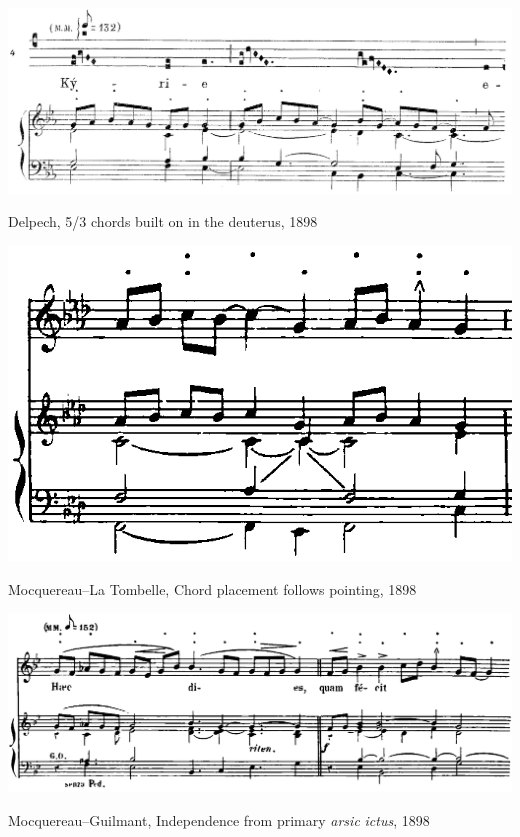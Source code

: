 \begin{example}
  \centering
  \includegraphics[width=\linewidth]{c/3/ex/delpech_deuterus_23.png}
  \caption{Delpech, 5/3 chords built on  in the deuterus, 1898}
  \label{mus:delpech_deuterus_23}
\end{example}

\vspace*{\fill}

\newpage

\vspace*{\fill}

\begin{example}
  \centering
  \includegraphics[width=.6\linewidth]{c/3/ex/latombelle_pascha.png}
  \caption{Mocquereau--La Tombelle, Chord placement follows pointing, 1898}
  \label{mus:latombelle_pascha}
\end{example}

\vspace*{\fill}

\begin{example}
  \centering
  \includegraphics[width=.9\linewidth]{c/3/ex/guilmant_haec.png}
  \caption{Mocquereau--Guilmant, Independence from primary \emph{arsic} \emph{ictus}, 1898}
  \label{mus:guilmant_haec}
\end{example}

